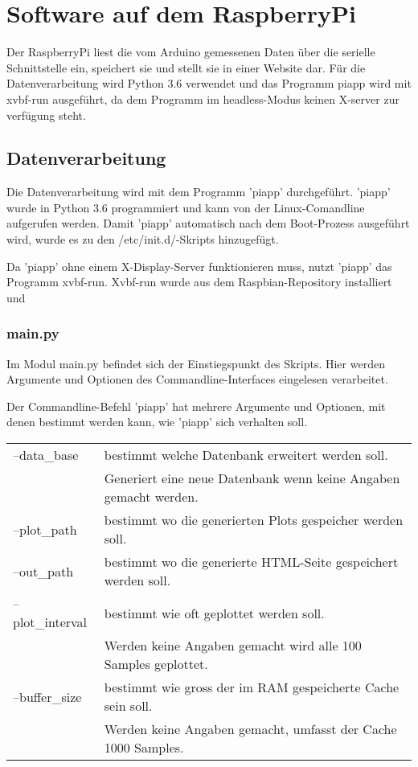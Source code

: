 \documentclass{article}
\begin{document}
\section{Software auf dem RaspberryPi}
Der RaspberryPi liest die vom Arduino gemessenen Daten über die serielle Schnittstelle ein, speichert sie und stellt sie in einer Website dar.
Für die Datenverarbeitung wird Python 3.6 verwendet und das Programm piapp wird mit xvbf-run ausgeführt, da dem Programm im headless-Modus keinen X-server zur verfügung steht.
\subsection{Datenverarbeitung}
Die Datenverarbeitung wird mit dem Programm 'piapp' durchgeführt.
'piapp' wurde in Python 3.6 programmiert und kann von der Linux-Comandline aufgerufen werden.
Damit 'piapp' automatisch nach dem Boot-Prozess ausgeführt wird, wurde es zu den /etc/init.d/-Skripts hinzugefügt.

Da 'piapp' ohne einem X-Display-Server funktionieren muss, nutzt 'piapp' das Programm xvbf-run.
Xvbf-run wurde aus dem Raspbian-Repository installiert und

\subsubsection{main.py}
Im Modul main.py befindet sich der Einstiegspunkt des Skripts.
Hier werden Argumente und Optionen des Commandline-Interfaces eingelesen verarbeitet.

Der Commandline-Befehl 'piapp' hat mehrere Argumente und Optionen, mit denen bestimmt werden kann, wie 'piapp' sich verhalten soll.

\begin{tabular}{l l}
--data\_base     & bestimmt welche Datenbank erweitert werden soll. \\
~                & Generiert eine neue Datenbank wenn keine Angaben gemacht werden. \\
--plot\_path     & bestimmt wo die generierten Plots gespeicher werden soll. \\
--out\_path      & bestimmt wo die generierte HTML-Seite gespeichert werden soll. \\
--plot\_interval & bestimmt wie oft geplottet werden soll. \\
~                & Werden keine Angaben gemacht wird alle 100 Samples geplottet. \\
--buffer\_size   & bestimmt wie gross der im RAM gespeicherte Cache sein soll. \\
~                & Werden keine Angaben gemacht, umfasst der Cache 1000 Samples. 
\end{tabular}
\end{document}
